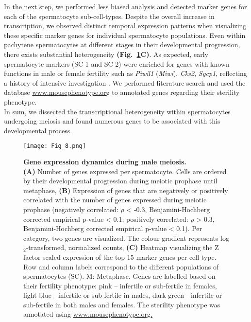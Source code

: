 In the next step, we performed less biased analysis and detected marker genes for each of the spermatocyte sub-cell-types. Despite the overall increase in transcription, we observed distinct temporal expression patterns when visualizing these specific marker genes for individual spermatocyte populations. Even within pachytene spermatocytes at different stages in their developmental progression, there exists substantial heterogeneity \textbf{(Fig.~\ref{fig3:meiosis}C)}. As expected, early spermatocyte markers (SC 1 and SC 2) were enriched for genes with known functions in male or female fertility such as \textit{Piwil1} (\textit{Miwi}), \textit{Cks2}, \textit{Sycp1}, reflecting a history of intensive investigation \citep{Deng2002, Spruck2003, Vries2005}. We performed literature search and used the database \url{www.mousephenotype.org} to annotated genes regarding their sterility phenotype. \\

In sum, we dissected the transcriptional heterogeneity within spermatocytes undergoing meiosis and found numerous genes to be associated with this developmental process.

\newpage

\begin{figure}[!h]
\centering
\texttt{[image: Fig\_8.png]}
\caption[Gene expression dynamics during male meiosis]{\textbf{Gene expression dynamics during male meiosis.} \\
\textbf{(A)} Number of genes expressed per spermatocyte. Cells are ordered by their developmental progression during meiotic prophase until metaphase, \textbf{(B)} Expression of genes that are negatively or positively correlated with the number of genes expressed during meiotic prophase (negatively correlated: $\rho$ < -0.3, Benjamini-Hochberg corrected empirical p-value < 0.1; positively correlated: $\rho$ > 0.3, Benjamini-Hochberg corrected empirical p-value < 0.1). Per category, two genes are visualized. The colour gradient represents log$_2$-transformed, normalized counts, \textbf{(C)} Heatmap visualizing the Z factor scaled expression of the top 15 marker genes per cell type. Row and column labels correspond to the different populations of spermatocytes (SC). M: Metaphase. Genes are labelled based on their fertility phenotype: pink – infertile or sub-fertile in females, light blue - infertile or sub-fertile in males, dark green - infertile or sub-fertile in both males and females. The sterility phenotype was annotated using \url{www.mousephenotype.org.}}
\label{fig3:meiosis}
\end{figure}

